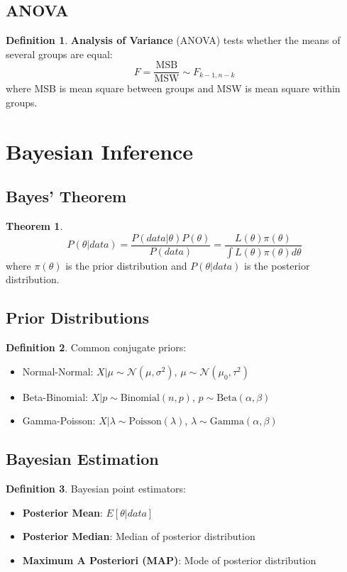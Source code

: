 \documentclass[11pt]{article}
\theoremstyle{definition}
\newtheorem{definition}{Definition}[section]
\newtheorem{theorem}{Theorem}[section]
\begin{document}
\subsection{ANOVA}
\begin{definition}
\textbf{Analysis of Variance} (ANOVA) tests whether the means of several groups are equal:
$$F = \frac{\text{MSB}}{\text{MSW}} \sim F_{k-1, n-k}$$
where MSB is mean square between groups and MSW is mean square within groups.
\end{definition}

\section{Bayesian Inference}

\subsection{Bayes' Theorem}
\begin{theorem}
$$P(\theta|data) = \frac{P(data|\theta)P(\theta)}{P(data)} = \frac{L(\theta)\pi(\theta)}{\int L(\theta)\pi(\theta)d\theta}$$
where $\pi(\theta)$ is the prior distribution and $P(\theta|data)$ is the posterior distribution.
\end{theorem}

\subsection{Prior Distributions}
\begin{definition}
Common conjugate priors:
\begin{itemize}
    \item Normal-Normal: $X|\mu \sim \mathcal{N}(\mu, \sigma^2)$, $\mu \sim \mathcal{N}(\mu_0, \tau^2)$
    \item Beta-Binomial: $X|p \sim \text{Binomial}(n,p)$, $p \sim \text{Beta}(\alpha, \beta)$
    \item Gamma-Poisson: $X|\lambda \sim \text{Poisson}(\lambda)$, $\lambda \sim \text{Gamma}(\alpha, \beta)$
\end{itemize}
\end{definition}

\subsection{Bayesian Estimation}
\begin{definition}
Bayesian point estimators:
\begin{itemize}
    \item \textbf{Posterior Mean}: $E[\theta|data]$
    \item \textbf{Posterior Median}: Median of posterior distribution
    \item \textbf{Maximum A Posteriori (MAP)}: Mode of posterior distribution
\end{itemize}
\end{definition}
\end{document}
